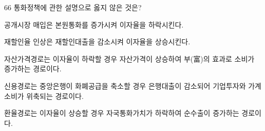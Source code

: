 \begin{question}{66}
통화정책에 관한 설명으로 옳지 않은 것은?
\begin{choices}
  \item 공개시장 매입은 본원통화를 증가시켜 이자율을 하락시킨다.
  \item 재할인율 인상은 재할인대출을 감소시켜 이자율을 상승시킨다.
  \item 자산가격경로는 이자율이 하락할 경우 자산가격이 상승하여 부(富)의 효과로 소비가 증가하는 경로이다.
  \item 신용경로는 중앙은행이 화폐공급을 축소할 경우 은행대출이 감소되어 기업투자와 가계소비가 위축되는 경로이다.
  \item 환율경로는 이자율이 상승할 경우 자국통화가치가 하락하여 순수출이 증가하는 경로이다.
\end{choices}
\end{question}
